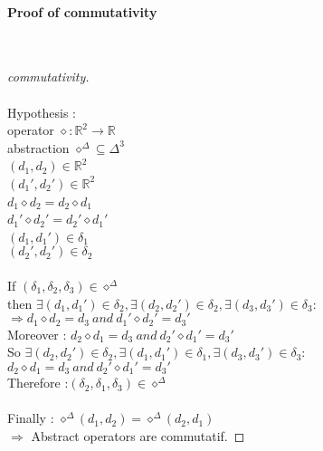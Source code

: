 \documentclass[a4paper,10pt]{report}
\begin{document}
\paragraph{Proof of commutativity} \mbox{}\\
    \begin{proof}[commutativity]
   ~\\~\\Hypothesis :
   ~\\ operator $ \diamond : {\mathbb{R}}^2 \rightarrow \mathbb{R}$
   ~\\ abstraction $ {\diamond}^\Delta \subseteq {\Delta}^3 $
   ~\\ $(d_{1}, d_{2}) \in \mathbb{R}^2 $
   ~\\ $(d_{1}', d_{2}') \in \mathbb{R}^2 $
   ~\\ $d_{1} \diamond d_{2} = d_{2} \diamond d_{1}$
   ~\\ $d_{1}' \diamond d_{2}' = d_{2}' \diamond d_{1}'$
   ~\\ $(d_{1}, d_{1}') \in \delta_1 $
   ~\\ $(d_{2}', d_{2}') \in \delta_2 $\\
   ~\\If $ (\delta_1 , \delta_2 , \delta_3 ) \in \diamond^\Delta$ \\
   then $ \exists (d_{1}, d_{1}') \in \delta_2 , \exists (d_{2}, d_{2}') \in \delta_2 , \exists (d_{3}, d_{3}') \in \delta_3 : $
   ~\\ $ \Rightarrow d_{1} \diamond d_2 = d_3\ and\ d_{1}'\diamond d_2' = d_3' $ 
   \\Moreover : $ d_2 \diamond d_1 = d_3\ and\ d_2' \diamond d_1' = d_3' $
   \\So $ \exists (d_2,d_2') \in \delta_2 , \exists (d_1,d_1') \in \delta_1 , \exists (d_3,d_3') \in \delta_3 : $
   ~\\ $ d_2 \diamond d_1 = d_3 \ and\  d_2' \diamond d_1' = d_3' $
   \\Therefore :$ (\delta_2, \delta_1, \delta_3) \in \diamond^\Delta$
   \\~\\Finally : $\diamond^\Delta(d_1,d_2) = \diamond^\Delta(d_2,d_1)$
   \\ $\Rightarrow$ Abstract operators are commutatif.
    \end{proof}
\end{document}
